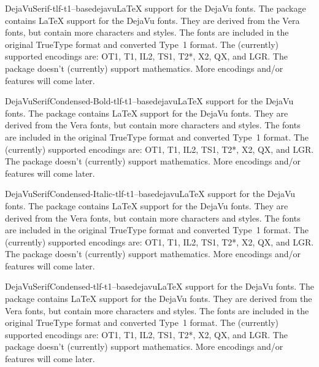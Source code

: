 \documentclass{ddltxtyp}
\begin{document}
\begin{package}{DejaVuSerif-tlf-t1--base}{dejavu}{{\LaTeX} support for the DejaVu fonts.}
The package contains {\LaTeX} support for the DejaVu fonts. They
are derived from the Vera fonts, but contain more characters
and styles. The fonts are included in the original TrueType
format and converted Type~1 format. The (currently) supported
encodings are: OT1, T1, IL2, TS1, T2*, X2, QX, and LGR. The
package doesn't (currently) support mathematics. More encodings
and/or features will come later.
\end{package}

\begin{package}{DejaVuSerifCondensed-Bold-tlf-t1--base}{dejavu}{{\LaTeX} support for the DejaVu fonts.}
The package contains {\LaTeX} support for the DejaVu fonts. They
are derived from the Vera fonts, but contain more characters
and styles. The fonts are included in the original TrueType
format and converted Type~1 format. The (currently) supported
encodings are: OT1, T1, IL2, TS1, T2*, X2, QX, and LGR. The
package doesn't (currently) support mathematics. More encodings
and/or features will come later.
\end{package}


\begin{package}{DejaVuSerifCondensed-Italic-tlf-t1--base}{dejavu}{{\LaTeX} support for the DejaVu fonts.}
The package contains {\LaTeX} support for the DejaVu fonts. They
are derived from the Vera fonts, but contain more characters
and styles. The fonts are included in the original TrueType
format and converted Type~1 format. The (currently) supported
encodings are: OT1, T1, IL2, TS1, T2*, X2, QX, and LGR. The
package doesn't (currently) support mathematics. More encodings
and/or features will come later.
\end{package}

\begin{package}{DejaVuSerifCondensed-tlf-t1--base}{dejavu}{{\LaTeX} support for the DejaVu fonts.}
The package contains {\LaTeX} support for the DejaVu fonts. They
are derived from the Vera fonts, but contain more characters
and styles. The fonts are included in the original TrueType
format and converted Type~1 format. The (currently) supported
encodings are: OT1, T1, IL2, TS1, T2*, X2, QX, and LGR. The
package doesn't (currently) support mathematics. More encodings
and/or features will come later.
\end{package}
\end{document}

